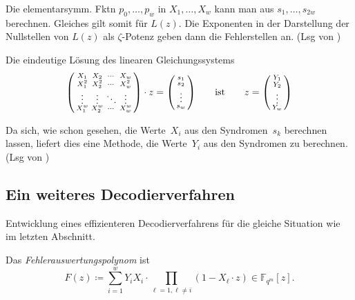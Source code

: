 \documentclass{cheat-sheet}
\newcommand{\F}{\mathbb{F}} %
\newcommand*\circled[1]{\tikz[baseline=(char.base)]{
            \node[shape=circle,draw,inner sep=1pt] (char) {\scriptsize #1};}}
\begin{document}
\begin{folgerung}
  Die elementarsymm. Fktn $p_0, \ldots, p_w$ in $X_1, \ldots, X_w$ kann man aus $s_1, \ldots, s_{2 w}$ berechnen.
  Gleiches gilt somit für $L(z)$.
  Die Exponenten in der Darstellung der Nullstellen von $L(z)$ als $\zeta$-Potenz geben dann die Fehlerstellen an.
  \hfill (Lsg von \circled{2})
\end{folgerung}

\begin{satz}
  Die eindeutige Lösung des linearen Gleichungssystems
  \[
    \begin{psmallmatrix}
      X_1 & X_2 & \cdots & X_w \\
      X_1^2 & X_2^2 & \cdots & X_w^2 \\
      \vdots & \vdots & \ddots & \vdots \\
      X_1^w & X_2^w & \cdots & X_w^w
    \end{psmallmatrix} \cdot z = \begin{psmallmatrix}
      s_1 \\ s_2 \\ \vdots \\ s_w
    \end{psmallmatrix}
    \qquad \text{ist} \qquad
    z = \begin{psmallmatrix}
      Y_1 \\ Y_2 \\ \vdots \\ Y_w
    \end{psmallmatrix}
  \]
\end{satz}

\begin{folgerung}
  Da sich, wie schon gesehen, die Werte~$X_i$ aus den Syndromen~$s_k$ berechnen lassen, liefert dies eine Methode, die Werte~$Y_i$ aus den Syndromen zu berechnen.
  \hfill (Lsg von \circled{3})
\end{folgerung}

\subsection{Ein weiteres Decodierverfahren}

\begin{ziel}
  Entwicklung eines effizienteren Decodierverfahrens für die gleiche Situation wie im letzten Abschnitt.
\end{ziel}

\begin{defn}
  Das \emph{Fehlerauswertungspolynom} ist
  \[
    F(z) \coloneqq \sum_{i=1}^w Y_i X_i \cdot \prod_{\ell = 1, \ell \neq i} (1 - X_\ell \cdot z) \in \F_{q^m} [z].
  \]
\end{defn}
\end{document}
